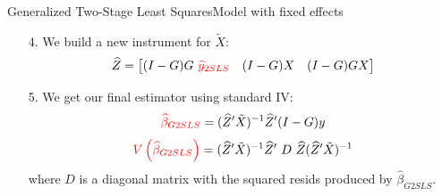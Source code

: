 \documentclass[aspectratio=169]{beamer}
\begin{document}
\begin{frame}{Generalized Two-Stage Least Squares}{Model with fixed effects}
\begin{itemize}
\item[4.] We build a new instrument for $\tilde{X}$:
$$\hat{Z}=\begin{bmatrix} (I-G) G \ \textcolor{red}{\hat{y}_{2SLS}} & (I-G)X & (I-G)GX \end{bmatrix}$$
\item[5.] We get our final estimator using standard IV:
$$ \textcolor{red}{\hat{\beta}_{G2SLS}} = (\hat{Z}'\tilde{X})^{-1} \hat{Z}'(I-G)y$$
$$ \textcolor{red}{V\left(\hat{\beta}_{G2SLS}\right)} = (\hat{Z}'\tilde{X})^{-1} \hat{Z}'\ D \ \hat{Z} (\hat{Z}'\tilde{X})^{-1}$$
where $D$ is a diagonal matrix with the squared resids produced by $\hat{\beta}_{G2SLS}$.
\end{itemize}
\hyperlink{main}{}
\end{frame}
\end{document}
